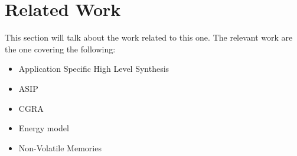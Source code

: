 \section{Related Work}
This section will talk about the work related to this one.
The relevant work are the one covering the following:
\begin{itemize}
	\item Application Specific High Level Synthesis~\cite{Coussy:2008:HSA:1457713,Kato2008}
	\item ASIP~\cite{Jordans2014,EusseSAMOS2014,Jozwiak2013}
	\item CGRA~\cite{7284058,8686088}
	\item Energy model~\cite{Yannan2019}
	\item Non-Volatile Memories
\end{itemize}
